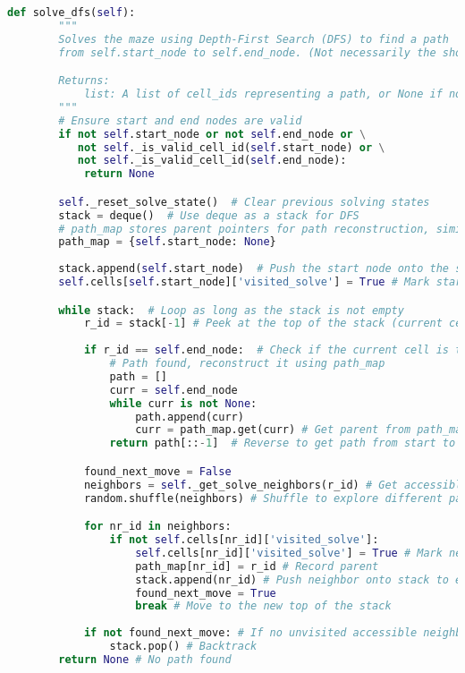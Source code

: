 \documentclass[UTF8]{report}
\theoremstyle{MyLineTheoremStyle} %
\theoremstyle{MyBlockTheoremStyle} %
\theoremstyle{MySubsubsectionStyle} %
\begin{document}
\begin{lstlisting}[language=Python, caption={迷宫生成与求解程序代码}]
    def solve_dfs(self):
        """
        Solves the maze using Depth-First Search (DFS) to find a path
        from self.start_node to self.end_node. (Not necessarily the shortest).

        Returns:
            list: A list of cell_ids representing a path, or None if no path is found.
        """
        # Ensure start and end nodes are valid
        if not self.start_node or not self.end_node or \
           not self._is_valid_cell_id(self.start_node) or \
           not self._is_valid_cell_id(self.end_node):
            return None

        self._reset_solve_state()  # Clear previous solving states
        stack = deque()  # Use deque as a stack for DFS
        # path_map stores parent pointers for path reconstruction, similar to BFS's self.cells[id]['parent']
        path_map = {self.start_node: None} 
        
        stack.append(self.start_node)  # Push the start node onto the stack
        self.cells[self.start_node]['visited_solve'] = True # Mark start node as visited when pushed

        while stack:  # Loop as long as the stack is not empty
            r_id = stack[-1] # Peek at the top of the stack (current cell)
            
            if r_id == self.end_node:  # Check if the current cell is the end node
                # Path found, reconstruct it using path_map
                path = []
                curr = self.end_node
                while curr is not None:
                    path.append(curr)
                    curr = path_map.get(curr) # Get parent from path_map
                return path[::-1]  # Reverse to get path from start to end

            found_next_move = False
            neighbors = self._get_solve_neighbors(r_id) # Get accessible neighbors
            random.shuffle(neighbors) # Shuffle to explore different paths on subsequent runs (DFS specific)

            for nr_id in neighbors:
                if not self.cells[nr_id]['visited_solve']:
                    self.cells[nr_id]['visited_solve'] = True # Mark neighbor as visited when pushed
                    path_map[nr_id] = r_id # Record parent
                    stack.append(nr_id) # Push neighbor onto stack to explore next
                    found_next_move = True
                    break # Move to the new top of the stack
            
            if not found_next_move: # If no unvisited accessible neighbor was found
                stack.pop() # Backtrack
        return None # No path found


\end{lstlisting}
\end{document}

